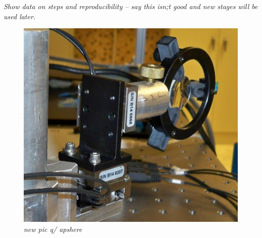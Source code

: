 \emph{\color{gray}Show data on steps and reproducibility -- say this isn;t good and new stages will be used later.}

\begin{figure} %
        \centering
                \includegraphics[width=.5\textwidth]{figures/100_1885.JPG}
                \caption{\color{gray}\emph{new pic q/ apshere}}
\label{fig:laserStages}
\end{figure}
